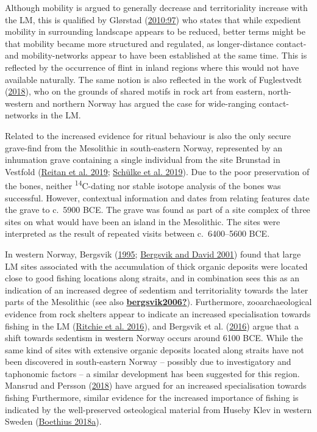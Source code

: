 \documentclass[
  12pt,
  a4paper,
  oneside]{book}
\begin{document}
Although mobility is argued to generally decrease and territoriality increase with the LM, this is qualified by Glørstad (\protect\hyperlink{ref-glorstad2010}{2010:97}) who states that while expedient mobility in surrounding landscape appears to be reduced, better terms might be that mobility became more structured and regulated, as longer-distance contact- and mobility-networks appear to have been established at the same time. This is reflected by the occurrence of flint in inland regions where this would not have available naturally. The same notion is also reflected in the work of Fuglestvedt (\protect\hyperlink{ref-fuglestvedt2018}{2018}), who on the grounds of shared motifs in rock art from eastern, north-western and northern Norway has argued the case for wide-ranging contact-networks in the LM.

Related to the increased evidence for ritual behaviour is also the only secure grave-find from the Mesolithic in south-eastern Norway, represented by an inhumation grave containing a single individual from the site Brunstad in Vestfold (\protect\hyperlink{ref-reitan2019}{Reitan et al. 2019}; \protect\hyperlink{ref-schulke2019}{Schülke et al. 2019}). Due to the poor preservation of the bones, neither \textsuperscript{14}C-dating nor stable isotope analysis of the bones was successful. However, contextual information and dates from relating features date the grave to c.~5900 BCE. The grave was found as part of a site complex of three sites on what would have been an island in the Mesolithic. The sites were interpreted as the result of repeated visits between c.~6400--5600 BCE.

In western Norway, Bergsvik (\protect\hyperlink{ref-bergsvik1995}{1995}; \protect\hyperlink{ref-bergsvik2001}{Bergsvik and David 2001}) found that large LM sites associated with the accumulation of thick organic deposits were located close to good fishing locations along straits, and in combination sees this as an indication of an increased degree of sedentism and territoriality towards the later parts of the Mesolithic (see also \protect\hyperlink{ref-bergsvik2006}{\textbf{bergsvik2006?}}). Furthermore, zooarchaeological evidence from rock shelters appear to indicate an increased specialisation towards fishing in the LM (\protect\hyperlink{ref-ritchie2016}{Ritchie et al. 2016}), and Bergsvik et al. (\protect\hyperlink{ref-bergsvik2016}{2016}) argue that a shift towards sedentism in western Norway occurs around 6100 BCE. While the same kind of sites with extensive organic deposits located along straits have not been discovered in south-eastern Norway -- possibly due to investigatory and taphonomic factors -- a similar development has been suggested for this region. Mansrud and Persson (\protect\hyperlink{ref-mansrud2018}{2018}) have argued for an increased specialisation towards fishing Furthermore, similar evidence for the increased importance of fishing is indicated by the well-preserved osteological material from Huseby Klev in western Sweden (\protect\hyperlink{ref-boethius2018}{Boethius 2018a}).
\end{document}

